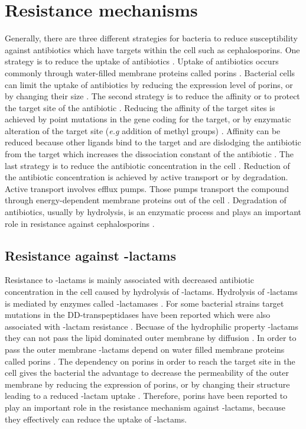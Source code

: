 \section{Resistance mechanisms}
Generally, there are three different strategies for bacteria to reduce susceptibility against antibiotics which have targets within the cell such as cephalosporins. One strategy is to reduce the uptake of antibiotics \cite{barreteau_cytoplasmic_2008}. Uptake of antibiotics occurs commonly through water-filled membrane proteins called porins \cite{fernandez_adaptive_2012}. Bacterial cells can limit the uptake of antibiotics by reducing the expression level of porins, or by changing their size \cite{fernandez_adaptive_2012}. The second strategy is to reduce the affinity or to protect the target site of the antibiotic \cite{munita_mechanisms_2016}. Reducing the affinity of the target sites is achieved by point mutations in the gene coding for the target, or by enzymatic alteration of the target site (\textit{e.g} addition of methyl groups) \cite{munita_mechanisms_2016}. Affinity can be reduced because other ligands bind to the target and are dislodging the antibiotic from the target which increases the dissociation constant of the antibiotic \cite{connell_ribosomal_2003}. The last strategy is to reduce the antibiotic concentration in the cell \cite{munita_mechanisms_2016}. Reduction of the antibiotic concentration is achieved by active transport or by degradation. Active transport involves efflux pumps. Those pumps transport the compound through energy-dependent membrane proteins out of the cell \cite{fernandez_adaptive_2012}. Degradation of antibiotics, usually by hydrolysis, is an enzymatic process and plays an important role in resistance against cephalosporins \cite{poole_resistance_2004}.  
\subsection{Resistance against \textbeta-lactams}
Resistance to \textbeta-lactams is mainly associated with decreased antibiotic concentration in the cell caused by hydrolysis of \textbeta-lactams. Hydrolysis of \textbeta-lactams is mediated by enzymes called \textbeta-lactamases \cite{poole_resistance_2004}. For some bacterial strains target mutations in the DD-transpeptidases have been reported which were also associated with \textbeta-lactam resistance \cite{poole_resistance_2004}. Becuase of the hydrophilic property \textbeta-lactams they can not pass the lipid dominated outer membrane by diffusion \cite{poole_resistance_2004}. In order to pass the outer membrane \textbeta-lactams depend on water filled membrane proteins called porins \cite{fernandez_adaptive_2012}. The dependency on porins in order to reach the target site in the cell gives the bacterial the advantage to decrease the permeability of the outer membrane by reducing the expression of porins, or by changing their structure leading to a reduced \textbeta-lactam uptake \cite{poole_resistance_2004}. Therefore, porins have been reported to play an important role in the resistance mechanism against \textbeta-lactams, because they effectively can reduce the uptake of \textbeta-lactams\cite{poole_resistance_2004}.
